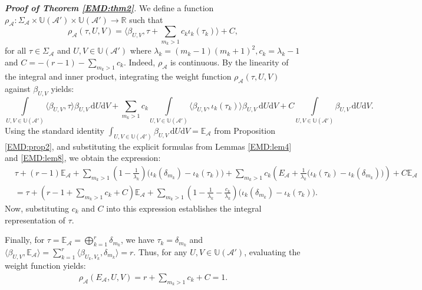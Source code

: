 \documentclass[11pt,reqno]{amsart}
\theoremstyle{definition}
\theoremstyle{plain}
\theoremstyle{remark}
\newcommand{\la}{\langle}
\newcommand{\ra}{\rangle}
\numberwithin{equation}{section}%
\begin{document}
    
    \noindent\textit{\textbf{Proof of Theorem \ref{EMD:thm2}}.}
    	We define a function $\rho_{\mathcal{A}}: \Sigma_{\mathcal{A}} \times \mathbb{U}(\mathcal{A}') \times \mathbb{U}(\mathcal{A}') \to \mathbb{R}$ such that 
    	\[
    	\rho_{\mathcal{A}}(\tau, U, V) = \langle \beta_{U,V}, \tau + \sum_{m_k>1} c_k \iota_k(\tau_k) \rangle + C,
    	\]
    	 for all $\tau\in\Sigma_{\mathcal{A}}$ and $U,V\in\mathbb{U}(\mathcal{A}')$ where $\lambda_k = (m_k-1)(m_k+1)^2, c_k=\lambda_k-1$ and $C=-(r-1)-\sum_{m_k>1}c_k$. Indeed, $\rho_{\mathcal{A}}$ is continuous. By the linearity of the integral and inner product, integrating the weight function $\rho_{\mathcal{A}}(\tau, U, V)$ against $\beta_{U,V}$ yields:
    		\[\int\limits_{U,V\in\mathbb{U}(\mathcal{A}')} \langle \beta_{U,V}, \tau \rangle \beta_{U,V} \, \mathrm{d}U\mathrm{d}V + \sum_{m_k>1} c_k \int\limits_{U,V\in\mathbb{U}(\mathcal{A}')}  \langle \beta_{U,V}, \iota_k(\tau_k) \rangle \beta_{U,V} \, \mathrm{d}U\mathrm{d}V + C \int\limits_{U,V\in\mathbb{U}(\mathcal{A}')}  \beta_{U,V} \, \mathrm{d}U\mathrm{d}V.\]
    		Using the standard identity $\int_{U,V\in\mathbb{U}(\mathcal{A}')} \beta_{U,V} \, \mathrm{d}U\mathrm{d}V = \mathbb{E}_{\mathcal{A}}$ from Proposition \ref{EMD:prop2}, and substituting the explicit formulas from Lemmas \ref{EMD:lem4} and \ref{EMD:lem8}, we obtain the expression:
    		\small
    		\begin{align*}
    			&\tau + (r-1)\mathbb{E}_{\mathcal{A}} + \sum_{m_k>1} \left(1-\frac{1}{\lambda_k}\right)\big(\iota_k(\delta_{m_k}) - \iota_k(\tau_k)\big) + \sum_{m_k>1} c_k \left( E_{\mathcal{A}} + \frac{1}{\lambda_k} \big(\iota_k(\tau_k) - \iota_k(\delta_{m_k})\big) \right) + C \mathbb{E}_{\mathcal{A}}\\
    			&=\tau+\left(r-1+\sum_{m_k>1}c_k +C\right)\mathbb{E}_{\mathcal{A}}+\sum_{m_k>1}\left(1-\frac{1}{\lambda_k}-\frac{c_k}{\lambda_k}\right)\big(\iota_k(\delta_{m_k}) - \iota_k(\tau_k)\big).
    		\end{align*}
    		\normalsize
    		Now, substituting $c_k$ and $C$ into this expression establishes the integral representation of $\tau$. 
    		
    		Finally, for $\tau = \mathbb{E}_{\mathcal{A}}=\bigoplus_{k=1}^r \delta_{m_k}$, we have $\tau_k = \delta_{m_k}$ and $\langle \beta_{U,V}, \mathbb{E}_{\mathcal{A}} \rangle=\sum_{k=1}^r\la\beta_{U_k,V_k},\delta_{m_k}\ra=r$. Thus, for any $U,V\in \mathbb{U}(\mathcal{A}')$, evaluating the weight function yields:
    		\begin{align*}
    			\rho_{\mathcal{A}}(E_{\mathcal{A}}, U, V) = r + \sum_{m_k>1} c_k+ C =1.\tag*{\qed}
    		\end{align*}
    		
\end{document}
